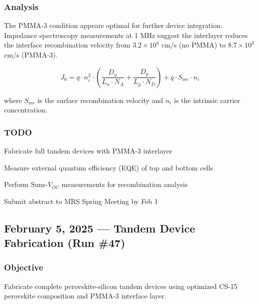 \documentclass[
    language=english,
    doctype=research-notebook,
    institution=none,
]{../../omnilatex}
\begin{document}
\subsubsection{Analysis}
The PMMA-3 condition appears optimal for further device integration.
Impedance spectroscopy measurements at 1 MHz suggest the interlayer
reduces the interface recombination velocity from $3.2 \times 10^4$
cm/s (no PMMA) to $8.7 \times 10^3$ cm/s (PMMA-3).

\begin{equation}
    J_0 = q \cdot n_i^2 \cdot \left(\frac{D_n}{L_n \cdot N_A} + \frac{D_p}{L_p \cdot N_D}\right) + q \cdot S_{\text{rec}} \cdot n_i
    \label{eq:recombination}
\end{equation}

where $S_{\text{rec}}$ is the surface recombination velocity and $n_i$
is the intrinsic carrier concentration.

\subsubsection{TODO}
\begin{todo}
    \item Fabricate full tandem devices with PMMA-3 interlayer
    \item Measure external quantum efficiency (EQE) of top and bottom cells
    \item Perform Suns-$V_{OC}$ measurements for recombination analysis
    \item Submit abstract to MRS Spring Meeting by Feb 1
\end{todo}

\subsection{February 5, 2025 --- Tandem Device Fabrication (Run \#47)}
\label{entry:feb05}

\subsubsection{Objective}
Fabricate complete perovskite-silicon tandem devices using optimized
CS-15 perovskite composition and PMMA-3 interface layer.
\end{document}
